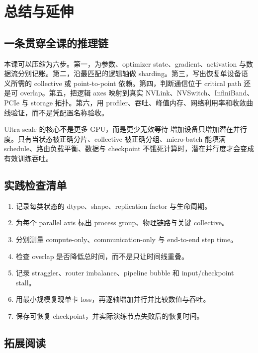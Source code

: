 \section{总结与延伸}

\subsection{一条贯穿全课的推理链}

本课可以压缩为六步。第一，为参数、optimizer state、gradient、activation 与数据流分别记账。第二，沿最匹配的逻辑轴做 sharding。第三，写出恢复单设备语义所需的 collective 或 point-to-point 依赖。第四，判断通信位于 critical path 还是可 overlap。第五，把逻辑 axes 映射到真实 NVLink、NVSwitch、InfiniBand、PCIe 与 storage 拓扑。第六，用 profiler、吞吐、峰值内存、网络利用率和收敛曲线验证，而不是凭配置名称验收。

\begin{importantbox}{Ultra-scale 的核心不是更多 GPU，而是更少无效等待}
增加设备只增加潜在并行度。只有当状态被正确分片、collective 被正确分组、micro-batch 能填满 schedule、路由负载平衡、数据与 checkpoint 不饿死计算时，潜在并行度才会变成有效训练吞吐。
\end{importantbox}

\subsection{实践检查清单}

\begin{enumerate}
  \item 记录每类状态的 dtype、shape、replication factor 与生命周期。
  \item 为每个 parallel axis 标出 process group、物理链路与关键 collective。
  \item 分别测量 compute-only、communication-only 与 end-to-end step time。
  \item 检查 overlap 是否降低总时间，而不是只让时间线重叠。
  \item 记录 straggler、router imbalance、pipeline bubble 和 input/checkpoint stall。
  \item 用最小规模复现单卡 loss，再逐轴增加并行并比较数值与吞吐。
  \item 保存可恢复 checkpoint，并实际演练节点失败后的恢复时间。
\end{enumerate}

\subsection{拓展阅读}

